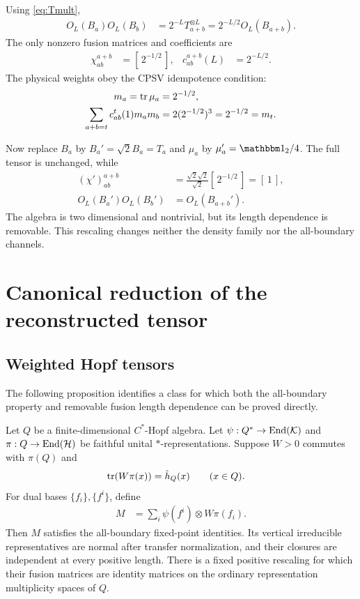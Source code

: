 \documentclass[aps,pra,reprint,nofootinbib,onecolumn]{revtex4-2}
\begin{document}
Using \cref{eq:Tmult},
\begin{align}
	O_L(B_a)O_L(B_b)
	 & =2^{-L}T_{a+b}^{\otimes L}
	=2^{-L/2}O_L(B_{a+b}).
\end{align}
The only nonzero fusion matrices and coefficients are
\begin{align}
	\chi_{ab}^{a+b} & =[\,2^{-1/2}\,],
	                &
	c_{ab}^{a+b}(L) & =2^{-L/2}.
	\label{eq:examplefusion}
\end{align}
The physical weights obey the CPSV idempotence condition:
\begin{align}
	m_a=\operatorname{tr}\mu_a & =2^{-1/2},
	\\
	\sum_{a+b=t}c_{ab}^{t}(1)m_am_b
	             & =2(2^{-1/2})^3=2^{-1/2}=m_t.
\end{align}

Now replace $B_a$ by $B_a'=\sqrt2 B_a=T_a$ and $\mu_a$ by
$\mu_a'=\Id_2/4$. The full tensor is unchanged, while
\begin{align}
	(\chi')_{ab}^{a+b}
	                   & =\frac{\sqrt2\sqrt2}{\sqrt2}[\,2^{-1/2}\,]=[\,1\,],
	\\
	O_L(B_a')O_L(B_b') & =O_L(B_{a+b}').
\end{align}
The algebra is two dimensional and nontrivial, but its length
dependence is removable. This rescaling changes neither the
density family nor the all-boundary channels.

\section{Canonical reduction of the reconstructed tensor}

\subsection{Weighted Hopf tensors}

The following proposition identifies a class for which both the
all-boundary property and removable fusion length dependence can be
proved directly.

\begin{proposition}
	\label{prop:hopf}
	Let $Q$ be a finite-dimensional $C^*$-Hopf algebra. Let
	$\psi:Q^*\to\operatorname{End}(\mathcal{K})$ and $\pi:Q\to\operatorname{End}(\mathcal{H})$ be faithful
	unital $*$-representations. Suppose $W>0$ commutes with $\pi(Q)$ and
	\begin{align}
		\operatorname{tr}(W\pi(x)) & =\hat h_Q(x)
		\qquad(x\in Q).
		\label{eq:weight}
	\end{align}
	For dual bases $\{f_i\},\{f^i\}$, define
	\begin{align}
		M & =\sum_i\psi(f^i)\otimes W\pi(f_i).
		\label{eq:hopftensor}
	\end{align}
	Then $M$ satisfies the all-boundary fixed-point identities. Its
	vertical irreducible representatives are normal after transfer
	normalization, and their closures are independent at every positive
	length. There is a fixed positive rescaling for which their fusion
	matrices are identity matrices on the ordinary representation
	multiplicity spaces of $Q$.
\end{proposition}
\end{document}
